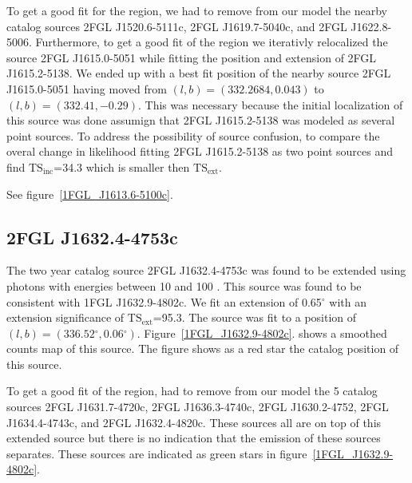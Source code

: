 \documentclass[12pt,preprint]{aastex}
\newcommand{\gev}{\text{GeV}\xspace}
\newcommand{\tsext}{{\ensuremath{\text{TS}_\text{ext}}}\xspace}
\newcommand{\tsinc}{\ensuremath{\text{TS}_\text{inc}}\xspace}
\renewcommand{\deg}{\ensuremath{^\circ}\xspace}
\begin{document}
 To get a good fit for the region, we had to remove from our
model the nearby catalog sources 2FGL J1520.6-5111c, 2FGL J1619.7-5040c,
and 2FGL J1622.8-5006. Furthermore, to get a good fit of the region we
iterativly relocalized the source 2FGL J1615.0-5051 while fitting the
position and extension of 2FGL J1615.2-5138.  We ended up with a best
fit position of the nearby source 2FGL J1615.0-5051 having moved from
$(l,b)=(332.2684,0.043)$ to $(l,b)=(332.41,-0.29)$. This was necessary
because the initial localization of this source was done assumign that
2FGL J1615.2-5138 was modeled as several point sources.  To address
the possibility of source confusion, to compare the overal change in
likelihood fitting 2FGL J1615.2-5138 as two point sources and find
\tsinc=34.3 which is smaller then \tsext.


See figure~\ref{1FGL_J1613.6-5100c}.


\subsection{2FGL J1632.4-4753c}




The two year catalog source 2FGL J1632.4-4753c was found to be extended
using photons with energies between 10 \gev and 100 \gev.  This source
was found to be consistent with 1FGL J1632.9-4802c.  We fit an
extension of 0.65\deg with an extension significance of \tsext=95.3.
The source was fit to a position of $(l,b)=(336.52\deg,0.06\deg)$.
Figure~\ref{1FGL_J1632.9-4802c}.  shows a smoothed counts map of this
source. The figure shows as a red star the catalog position
of this source.

To get a good fit of the region, had to remove from our model the 5
catalog sources 2FGL J1631.7-4720c, 2FGL J1636.3-4740c, 2FGL J1630.2-4752,
2FGL J1634.4-4743c, and 2FGL J1632.4-4820c. These sources all are on top
of this extended source but there is no indication that the emission of
these sources separates.  These sources are indicated as green stars in
figure~\ref{1FGL_J1632.9-4802c}.  
\end{document}
